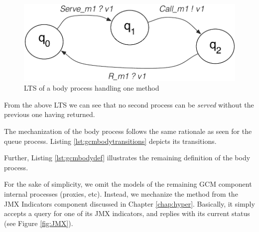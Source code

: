	\begin{figure}[H]
		 \centering
		\includegraphics[scale=0.6]{figures/chapter6/gcmbody.pdf}
		\caption{LTS of a body process handling one method}
		\label{fig:gcmbody}		
	\end{figure}		


	\noindent From the above \ac{LTS} we can see that no second process can be \textit{served} without the
	previous one having returned.
	
		The mechanization of the body process follows the same rationale as seen for the queue process.
	Listing \ref{lst:gcmbodytransitions} depicts its transitions.

			
	

	\noindent Further, Listing \ref{lst:gcmbodydef} illustrates the remaining definition of the body process. 

				

	
	For the sake of simplicity,	we omit the models of the remaining \ac{GCM} component internal processes (proxies, etc).
	Instead, we mechanize the method from the \textsf{JMX Indicators} component discussed in Chapter \ref{chap:hyper}.
	Basically, it simply accepts a query for one of its \ac{JMX} indicators, and replies with its current status (see Figure \ref{fig:JMX}).
		
	
			
	
